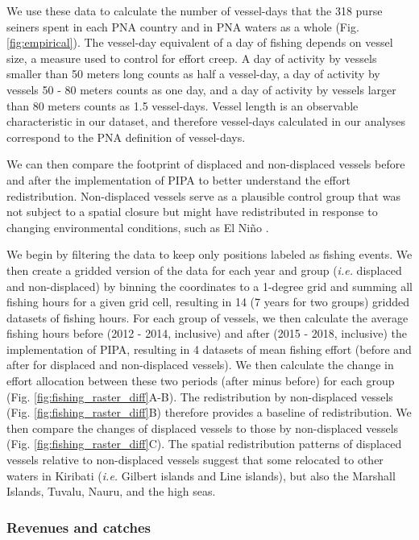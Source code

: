 \documentclass[12pt]{article}
\begin{document}
We use these data to calculate the number of vessel-days that the 318 purse seiners spent in each PNA country and in PNA waters as a whole (Fig. \ref{fig:empirical}). The vessel-day equivalent of a day of fishing depends on vessel size, a measure used to control for effort creep. A day of activity by vessels smaller than 50 meters long counts as half a vessel-day, a day of activity by vessels 50 - 80 meters counts as one day, and a day of activity by vessels larger than 80 meters counts as 1.5 vessel-days. Vessel length is an observable characteristic in our dataset, and therefore vessel-days calculated in our analyses correspond to the PNA definition of vessel-days.

We can then compare the footprint of displaced and non-displaced vessels before and after the implementation of PIPA to better understand the effort redistribution. Non-displaced vessels serve as a plausible control group that was not subject to a spatial closure but might have redistributed in response to changing environmental conditions, such as El Niño \cite{hanich2018unraveling,aqorau_2018}.

We begin by filtering the data to keep only positions labeled as fishing events. We then create a gridded version of the data for each year and group (\emph{i.e.} displaced and non-displaced) by binning the coordinates to a 1-degree grid and summing all fishing hours for a given grid cell, resulting in 14 (7 years for two groups) gridded datasets of fishing hours. For each group of vessels, we then calculate the average fishing hours before (2012 - 2014, inclusive) and after (2015 - 2018, inclusive) the implementation of PIPA, resulting in 4 datasets of mean fishing effort (before and after for displaced and non-displaced vessels). We then calculate the change in effort allocation between these two periods (after minus before) for each group (Fig. \ref{fig:fishing_raster_diff}A-B). The redistribution by non-displaced vessels (Fig. \ref{fig:fishing_raster_diff}B) therefore provides a baseline of redistribution. We then compare the changes of displaced vessels to those by non-displaced vessels (Fig. \ref{fig:fishing_raster_diff}C). The spatial redistribution patterns of displaced vessels relative to non-displaced vessels suggest that some relocated to other waters in Kiribati (\emph{i.e.} Gilbert islands and Line islands), but also the Marshall Islands, Tuvalu, Nauru, and the high seas.

\subsubsection{Revenues and catches}
\end{document}
